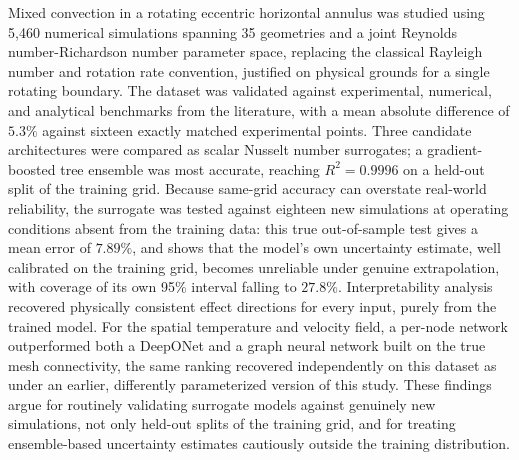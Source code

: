 Mixed convection in a rotating eccentric horizontal annulus was studied using 5,460 numerical simulations spanning 35 geometries and a joint Reynolds number-Richardson number parameter space, replacing the classical Rayleigh number and rotation rate convention, justified on physical grounds for a single rotating boundary. The dataset was validated against experimental, numerical, and analytical benchmarks from the literature, with a mean absolute difference of $5.3\%$ against sixteen exactly matched experimental points. Three candidate architectures were compared as scalar Nusselt number surrogates; a gradient-boosted tree ensemble was most accurate, reaching $R^2=0.9996$ on a held-out split of the training grid. Because same-grid accuracy can overstate real-world reliability, the surrogate was tested against eighteen new simulations at operating conditions absent from the training data: this true out-of-sample test gives a mean error of $7.89\%$, and shows that the model's own uncertainty estimate, well calibrated on the training grid, becomes unreliable under genuine extrapolation, with coverage of its own 95\% interval falling to $27.8\%$. Interpretability analysis recovered physically consistent effect directions for every input, purely from the trained model. For the spatial temperature and velocity field, a per-node network outperformed both a DeepONet and a graph neural network built on the true mesh connectivity, the same ranking recovered independently on this dataset as under an earlier, differently parameterized version of this study. These findings argue for routinely validating surrogate models against genuinely new simulations, not only held-out splits of the training grid, and for treating ensemble-based uncertainty estimates cautiously outside the training distribution.
